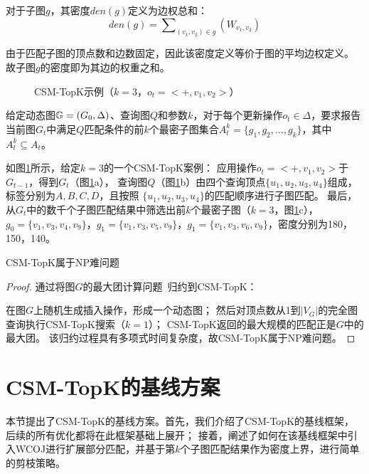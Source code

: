     \begin{definition}[子图密度]\label{def:subgraph-density}

    对于子图$g$，其密度$den(g)$定义为边权总和：
    \[
        den(g) = \sum\nolimits_{(v_1,v_2)\in g}\left(W_{v_1,v_2}\right)
    \]
    
    由于匹配子图的顶点数和边数固定，因此该密度定义等价于图的平均边权定义。
    故子图$g$的密度即为其边的权重之和。
    \end{definition}
    
    \begin{figure}[h!]
        \centering
        \caption{CSM-TopK示例（$k=3$，$o_t=<+,v_{1},v_{2}>$）}
        \label{fig:csm-topk}
    \end{figure}
    
    \begin{definition}\label{def:problem-definition}
    给定动态图$\mathbb{G}=(G_0, \Delta)$、查询图$Q$和参数$k$，对于每个更新操作$o_t\in \Delta$，要求报告当前图$G_t$中满足$Q$匹配条件的前$k$个最密子图集合$A_{t}^k= \{g_1, g_2, \ldots, g_k\}$，其中$A_t^k\subseteq A_t$。
    \end{definition}
    
    如图\ref{fig:csm-topk}所示，给定$k=3$的一个CSM-TopK案例：
    应用操作$o_t=<+,v_1, v_2>$于$G_{t-1}$，得到$G_t$（图\ref{fig:csm-topk}a），
    查询图$Q$（图\ref{fig:csm-topk}b）由四个查询顶点$\{u_1, u_2, u_3, u_4\}$组成，标签分别为$A,B,C,D$，且按照
    $\{u_1, u_2, u_3, u_4\}$的匹配顺序进行子图匹配。
    最后，从$G_t$中的数千个子图匹配结果中筛选出前$k$个最密子图（$k=3$，图\ref{fig:csm-topk}c），
    $g_0=\{v_1, v_3, v_4, v_9\}$，$g_1=\{v_1, v_3, v_5, v_9\}$，$g_1=\{v_1, v_3, v_6, v_9\}$，密度分别为180，150，140。
    
    \begin{theorem} \label{theorem:np-hard}
    CSM-TopK属于NP难问题
    \end{theorem}
    \begin{proof}
    通过将图$G$的最大团计算问题~\cite{clique-DBLP:journals/eor/WuH15}归约到CSM-TopK：
   
    在图$G$上随机生成插入操作，形成一个动态图；
    然后对顶点数从1到$|V_G|$的完全图查询执行CSM-TopK搜索（$k=1$）；
    CSM-TopK返回的最大规模的匹配正是$G$中的最大团。
    该归约过程具有多项式时间复杂度，故CSM-TopK属于NP难问题。
    \end{proof}
\section{CSM-TopK的基线方案}
本节提出了CSM-TopK的基线方案。首先，我们介绍了CSM-TopK的基线框架，后续的所有优化都将在此框架基础上展开；
接着，阐述了如何在该基线框架中引入WCOJ进行扩展部分匹配，并基于第$k$个子图匹配结果作为密度上界，进行简单的剪枝策略。

